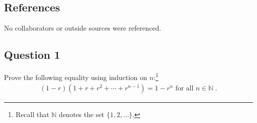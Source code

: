\runningheadrule
\firstpageheadrule
\cfoot{}
\subsection*{References}
No collaborators or outside sources were referenced.
\subsection*{Question 1}
Prove the following equality using induction on $n$:\footnote{Recall that $\mathbb{N}$ denotes the set $\{1,2,\ldots\}$.}
    \begin{align}
    (1-r)(1+r+r^2+ \cdots +r^{n-1}) = 1-r^n \text{ for all } n \in \mathbb{N}\;. \label{eq:geometric-sum}
    \end{align}
